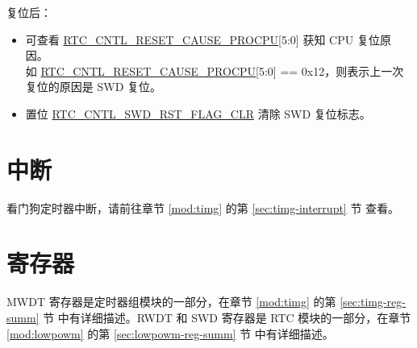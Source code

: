\documentclass[main\_\_CN.tex]{subfiles}
\begin{document}
复位后：
\begin{itemize}
    \item 可查看 \hyperref[fielddesc:RTCCNTLRESETCAUSEPROCPU]{RTC\_CNTL\_RESET\_CAUSE\_PROCPU}[5:0] 获知 CPU 复位原因。\\
	如 \hyperref[fielddesc:RTCCNTLRESETCAUSEPROCPU]{RTC\_CNTL\_RESET\_CAUSE\_PROCPU}[5:0] == 0x{}12，则表示上一次复位的原因是 SWD 复位。
	\item 置位 \hyperref[fielddesc:RTCCNTLSWDRSTFLAGCLR]{RTC\_CNTL\_SWD\_RST\_FLAG\_CLR} 清除 SWD 复位标志。
\end{itemize}

\section{中断}

看门狗定时器中断，请前往章节 \ref{mod:timg} \textit{} 的第 \ref{sec:timg-interrupt} 节 \textit{} 查看。

\section{寄存器}
MWDT 寄存器是定时器组模块的一部分，在章节 \ref{mod:timg} \textit{} 的第 \ref{sec:timg-reg-summ} 节 \textit{} 中有详细描述。RWDT 和 SWD 寄存器是 RTC 模块的一部分，在章节 \ref{mod:lowpowm} \textit{} 的第 \ref{sec:lowpowm-reg-summ} 节 \textit{} 中有详细描述。
\end{document}
